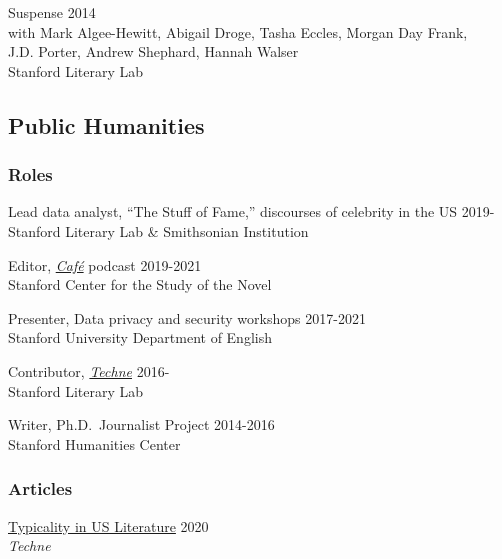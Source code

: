 \documentclass[
  12pt,
  letterpaper,
]{article}
\begin{document}
Suspense \hfill 2014\\
\hspace*{0.333em} with Mark Algee-Hewitt, Abigail Droge, Tasha Eccles,
Morgan Day Frank,\\
\hspace*{0.333em} J.D. Porter, Andrew Shephard, Hannah Walser\\
\hspace*{0.333em} Stanford Literary Lab

\hypertarget{public-humanities}{%
\subsection{Public Humanities}\label{public-humanities}}

\hypertarget{roles}{%
\subsubsection{Roles}\label{roles}}

Lead data analyst, ``The Stuff of Fame,'' discourses of celebrity in the
US \hfill 2019-\\
\hspace*{0.333em} Stanford Literary Lab \& Smithsonian Institution

Editor, \href{https://novel.stanford.edu/csn-cafe}{\emph{Café}} podcast
\hfill 2019-2021\\
\hspace*{0.333em} Stanford Center for the Study of the Novel

Presenter, Data privacy and security workshops \hfill 2017-2021\\
\hspace*{0.333em} Stanford University Department of English

Contributor, \href{https://litlab.stanford.edu/techne/}{\emph{Techne}}
\hfill 2016-\\
\hspace*{0.333em} Stanford Literary Lab

Writer, Ph.D.~Journalist Project \hfill 2014-2016\\
\hspace*{0.333em} Stanford Humanities Center

\hypertarget{articles}{%
\subsubsection{Articles}\label{articles}}

\href{https://web.archive.org/web/20220430165427/https://litlab.stanford.edu/typicality-in-the-u-s-novel/}{Typicality
in US Literature} \hfill 2020\\
\hspace*{0.333em} \emph{Techne}
\end{document}
